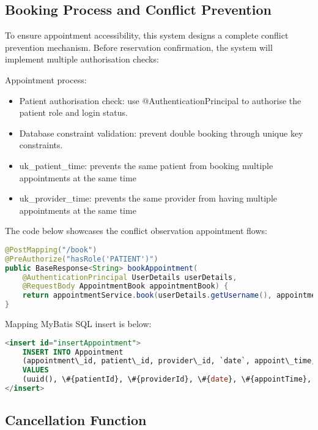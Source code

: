 \subsection{Booking Process and Conflict Prevention}
\label{subsec:booking-process}

To ensure appointment accessibility, this system designs a complete conflict prevention mechanism. Before reservation confirmation, the system will implement multiple authorisation checks:

Appointment process:
\begin{itemize}
    \item Patient authorisation check: use @AuthenticationPrincipal to authorise the patient role and login status.
    \item Database constraint validation: prevent double booking through unique key constraints.
    \item uk\_patient\_time: prevents the same patient from booking multiple appointments at the same time
    \item uk\_provider\_time: prevents the same provider from having multiple appointments at the same time
\end{itemize}

The code below showcases the conflict observation appointment flows:

\begin{lstlisting}[language=Java, caption=Appointment Booking Implementation]
@PostMapping("/book")
@PreAuthorize("hasRole('PATIENT')")
public BaseResponse<String> bookAppointment(
    @AuthenticationPrincipal UserDetails userDetails,
    @RequestBody AppointmentBook appointmentBook) {
    return appointmentService.book(userDetails.getUsername(), appointmentBook);
}
\end{lstlisting}

Mapping MyBatis SQL insert is below:

\begin{lstlisting}[language=SQL, caption=Appointment Insert Query]
<insert id="insertAppointment">
    INSERT INTO Appointment
    (appointment\_id, patient\_id, provider\_id, `date`, appoint\_time, status)
    VALUES
    (uuid(), \#{patientId}, \#{providerId}, \#{date}, \#{appointTime}, \#{status})
</insert>
\end{lstlisting}

\subsection{Cancellation Function}
\label{subsec:cancellation-function}

